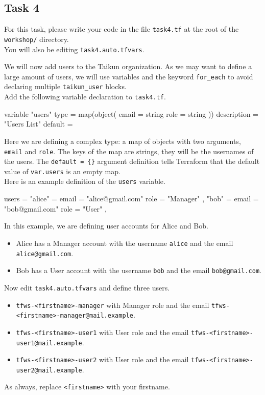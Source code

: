 \subsection{Task 4}\label{sec:task4}

\begin{note}
For this task, please write your code in the file \texttt{task4.tf}
at the root of the \texttt{workshop/} directory.\\
You will also be editing \texttt{task4.auto.tfvars}.
\end{note}

We will now add users to the Taikun organization.
As we may want to define a large amount of users, we will use variables
and the keyword \texttt{for\_each} to avoid declaring multiple \texttt{taikun\_user}
blocks.\\

Add the following variable declaration to \texttt{task4.tf}.
\begin{tf}
variable "users" {
  type = map(object({
    email = string
    role  = string
  }))
  description = "Users List"
  default     = {}
}
\end{tf}

Here we are defining a complex type: a map of objects with two arguments, \texttt{email} and \texttt{role}.
The keys of the map are strings, they will be the usernames of the users.
The \texttt{default = \{\}} argument definition tells Terraform that the default value of \texttt{var.users} is an empty map.\\

Here is an example definition of the \texttt{users} variable.
\begin{tf}
users = {
  "alice" = {
    email = "alice@gmail.com"
    role  = "Manager"
  },
  "bob" = {
    email = "bob@gmail.com"
    role  = "User"
  },
}
\end{tf}
In this example, we are defining user accounts for Alice and Bob.
\begin{itemize}
  \item Alice has a Manager account with the username \texttt{alice} and the email \texttt{alice@gmail.com}.
  \item Bob has a User account with the username \texttt{bob} and the email \texttt{bob@gmail.com}.
\end{itemize}
Now edit \texttt{task4.auto.tfvars} and define three users.
\begin{itemize}
  \item \texttt{tfws-<firstname>-manager} with Manager role and the email \texttt{tfws-<firstname>-manager@mail.example}.
  \item \texttt{tfws-<firstname>-user1} with User role and the email \texttt{tfws-<firstname>-user1@mail.example}.
  \item \texttt{tfws-<firstname>-user2} with User role and the email \texttt{tfws-<firstname>-user2@mail.example}.
\end{itemize}
As always, replace \texttt{<firstname>} with your firstname.\\

